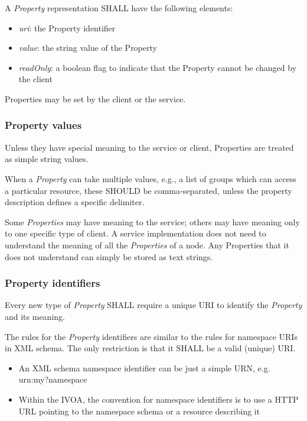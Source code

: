 \documentclass[11pt,a4paper]{ivoa}
\begin{document}
A \emph{Property} representation SHALL have the following elements:

\begin{itemize}
    \item \emph{uri}: the Property identifier
    \item \emph{value}: the string value of the Property
    \item \emph{readOnly}: a boolean flag to indicate that the Property cannot be changed by the client
\end{itemize}

Properties may be set by the client or the service.

\subsubsection{Property values}
\label{subsubsec:property values}
Unless they have special meaning to the service or client, Properties are treated as simple string values.

When a \emph{Property} can take multiple values, e.g., a list of groups which can access a particular resource, these SHOULD be comma-separated, unless the property description defines a specific delimiter.

Some \emph{Properties} may have meaning to the service; others may have meaning only to one specific type of client. A service implementation does not need to understand the meaning of all the \emph{Properties} of a node. Any Properties that it does not understand can simply be stored as text strings.

\subsubsection{Property identifiers}
\label{subsubsec:property identifiers}
Every new type of \emph{Property} SHALL require a unique URI to identify the \emph{Property} and its meaning.

The rules for the \emph{Property} identifiers are similar to the rules for namespace URIs in XML schema. The only restriction is that it SHALL be a valid (unique) URI.

\begin{itemize}
    \item An XML schema namespace identifier can be just a simple URN, e.g. urn:my?namespace
    \item Within the IVOA, the convention for namespace identifiers is to use a HTTP URL pointing to the namespace schema or a resource describing it
\end{itemize}
\end{document}
